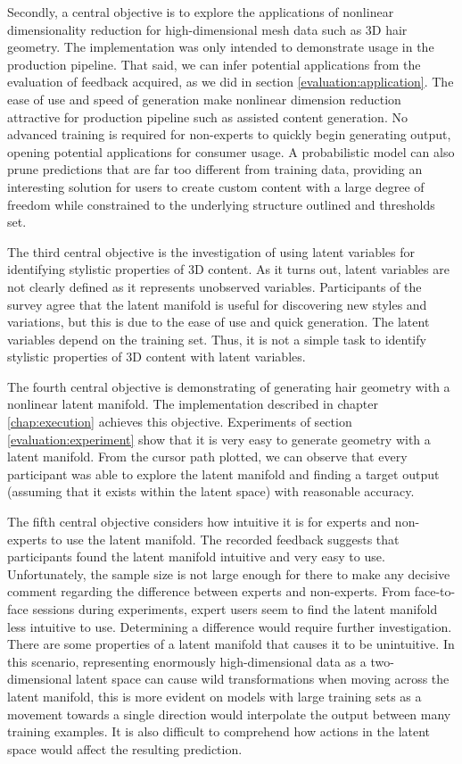 \documentclass[ %
author={Dillon Keith Diep},
supervisor={Dr. Carl Henrik Ek},
degree={MEng},
title={ART-CG Hair:},
subtitle={Assisted Real-time Content Generation of Stylised Virtual Hair},
type={Research},
year={2017} ]{dissertation}
\begin{document}
	
	Secondly, a central objective is to explore the applications of nonlinear dimensionality reduction for high-dimensional mesh data such as 3D hair geometry.
	The implementation was only intended to demonstrate usage in the production pipeline. That said, we can infer potential applications from the evaluation of feedback acquired, as we did in section \ref{evaluation:application}.
	The ease of use and speed of generation make nonlinear dimension reduction attractive for production pipeline such as assisted content generation.
	No advanced training is required for non-experts to quickly begin generating output, opening potential applications for consumer usage.
	A probabilistic model can also prune predictions that are far too different from training data, providing an interesting solution for users to create custom content with a large degree of freedom while constrained to the underlying structure outlined and thresholds set.
	
	The third central objective is the investigation of using latent variables for identifying stylistic properties of 3D content. As it turns out, latent variables are not clearly defined as it represents unobserved variables. Participants of the survey agree that the latent manifold is useful for discovering new styles and variations, but this is due to the ease of use and quick generation. The latent variables depend on the training set. Thus, it is not a simple task to identify stylistic properties of 3D content with latent variables.
	
	The fourth central objective is demonstrating of generating hair geometry with a nonlinear latent manifold. The implementation described in chapter \ref{chap:execution} achieves this objective. 
	Experiments of section \ref{evaluation:experiment} show that it is very easy to generate geometry with a latent manifold. From the cursor path plotted, we can observe that every participant was able to explore the latent manifold and finding a target output (assuming that it exists within the latent space) with reasonable accuracy.
	
	The fifth central objective considers how intuitive it is for experts and non-experts to use the latent manifold. The recorded feedback suggests that participants found the latent manifold intuitive and very easy to use. Unfortunately, the sample size is not large enough for there to make any decisive comment regarding the difference between experts and non-experts. From face-to-face sessions during experiments, expert users seem to find the latent manifold less intuitive to use. Determining a difference would require further investigation. There are some properties of a latent manifold that causes it to be unintuitive. In this scenario, representing enormously high-dimensional data as a two-dimensional latent space can cause wild transformations when moving across the latent manifold, this is more evident on models with large training sets as a movement towards a single direction would interpolate the output between many training examples. It is also difficult to comprehend how actions in the latent space would affect the resulting prediction.
	
\end{document}

